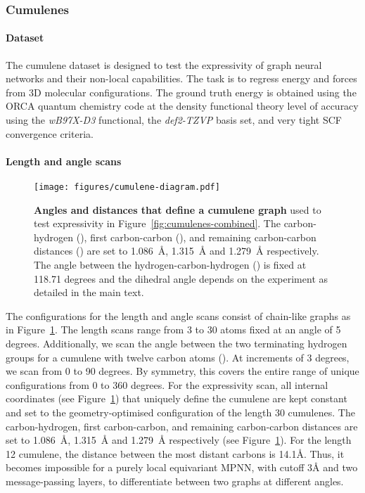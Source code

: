 \documentclass{article} \usepackage{iclr2024_conference,times}
\begin{document}
\subsubsection{Cumulenes}



\paragraph{Dataset}

The cumulene dataset is designed to test the expressivity of graph neural networks and their non-local capabilities. The task is to regress energy and forces from 3D molecular configurations. The ground truth energy is obtained using the ORCA quantum chemistry code at the density functional theory level of accuracy using the \textit{wB97X-D3} functional, the \textit{def2-TZVP} basis set, and very tight SCF convergence criteria. 


\paragraph{Length and angle scans}
\begin{figure}[h!t]
    \centering
    \texttt{[image: figures/cumulene-diagram.pdf]}
    \caption{\textbf{Angles and distances that define a cumulene graph} used to test expressivity in Figure~\ref{fig:cumulenes-combined}. The carbon-hydrogen (), first carbon-carbon (), and remaining carbon-carbon distances () are set to 1.086~\AA{}, 1.315~\AA{} and 1.279~\AA{} respectively. The angle between the hydrogen-carbon-hydrogen () is fixed at 118.71 degrees and the dihedral angle  depends on the experiment as detailed in the main text.}
    \label{fig:appendix-cumulene-graph}
\end{figure}
The configurations for the length and angle scans consist of chain-like graphs as in Figure~\ref{fig:appendix-cumulene-graph}. The length scans range from 3 to 30 atoms fixed at an angle of 5 degrees. Additionally, we scan the angle between the two terminating hydrogen groups for a cumulene with twelve carbon atoms (). At increments of 3 degrees, we scan from 0 to 90 degrees. By symmetry, this covers the entire range of unique configurations from 0 to 360 degrees. For the expressivity scan, all internal coordinates (see Figure~\ref{fig:appendix-cumulene-graph}) that uniquely define the cumulene are kept constant and set to the geometry-optimised configuration of the length 30 cumulenes. The carbon-hydrogen, first carbon-carbon, and remaining carbon-carbon distances are set to 1.086~\AA{}, 1.315~\AA{} and 1.279~\AA{} respectively (see Figure~\ref{fig:appendix-cumulene-graph}). For the length 12 cumulene, the distance between the most distant carbons is 14.1\AA{}. Thus, it becomes impossible for a purely local equivariant MPNN, with cutoff 3\AA{} and two message-passing layers, to differentiate between two graphs at different angles. 
\end{document}
